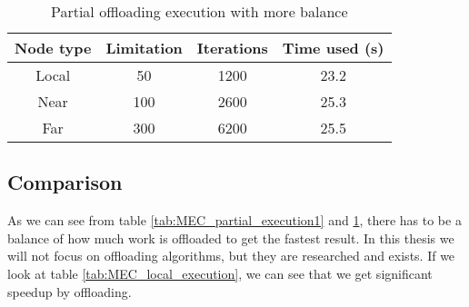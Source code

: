 \begin{table}[h!]
    \centering
    \begin{tabular}[c]{|c|c|c|c|}
        \hline
        Node type & Limitation & Iterations & Time used (s)\\
        \hline
        \hline
        Local & 50 & 1200 & 23.2 \\
        \hline
        Near & 100 & 2600 & 25.3 \\
        \hline
        Far & 300 & 6200 & 25.5 \\
        \hline
    \end{tabular}
    \caption{Partial offloading execution with more balance}
    \label{tab:MEC_partial_execution2}
\end{table}




\subsection{Comparison}
As we can see from table \ref{tab:MEC_partial_execution1} and \ref{tab:MEC_partial_execution2}, there has to be a balance of how much work is offloaded to get the fastest result. In this thesis we will not focus on offloading algorithms, but they are researched and exists. If we look at table \ref{tab:MEC_local_execution}, we can see that we get significant speedup by offloading.  %






